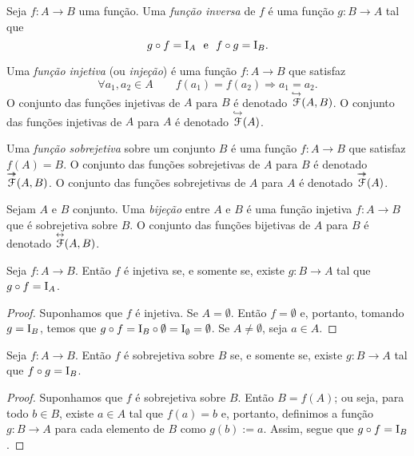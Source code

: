\begin{definition}
Seja $f\colon A \to B$ uma função. Uma \emph{função inversa} de $f$ é uma função $g\colon B \to A$ tal que
	\begin{equation*}
	g \circ f = \mathrm{I}_A \text{\ \ e\ \ } f \circ g = \mathrm{I}_B.
	\end{equation*}
\end{definition}

\begin{definition}
Uma \emph{função injetiva} (ou \emph{injeção}) é uma função $f\colon A \to B$ que satisfaz
	\begin{equation*}
	\forall a_1,a_2 \in A \qquad f(a_1)=f(a_2) \Rightarrow a_1=a_2.
	\end{equation*}
O conjunto das funções injetivas de $A$ para $B$ é denotado $\overset{\hookrightarrow}{\mathcal{F}}(A,B)$. O conjunto das funções injetivas de $A$ para $A$ é denotado $\overset{\hookrightarrow}{\mathcal{F}}(A)$.
\end{definition}

\begin{definition}
Uma \emph{função sobrejetiva} sobre um conjunto $B$ é uma função $f\colon A \to B$ que satisfaz $f(A)=B$. O conjunto das funções sobrejetivas de $A$ para $B$ é denotado $\Epi{\Func}(A,B)$. O conjunto das funções sobrejetivas de $A$ para $A$ é denotado $\Epi{\Func}(A)$.
\end{definition}

\begin{definition}
Sejam $A$ e $B$ conjunto. Uma \emph{bijeção} entre $A$ e $B$ é uma função injetiva $f\colon A \to B$ que é sobrejetiva sobre $B$. O conjunto das funções bijetivas de $A$ para $B$ é denotado $\overset{\leftrightarrow}{\mathcal{F}}(A,B)$.
\end{definition}

\begin{proposition}
\label{prop:func.inv.esq}
Seja $f\colon A \to B$. Então $f$ é injetiva se, e somente se, existe $g\colon B \to A$ tal que $g \circ f = \mathrm{I}_A$.
\end{proposition}
\begin{proof}
Suponhamos que $f$ é injetiva. Se $A = \emptyset$. Então $f=\emptyset$ e, portanto, tomando $g=\mathrm{I}_B$, temos que $g \circ f = \mathrm{I}_B \circ \emptyset = \mathrm{I}_\emptyset = \emptyset$.
	Se $A \neq \emptyset$, seja $a \in A$.
	
	
\end{proof}

\begin{proposition}
\label{prop:func.inv.dir}
Seja $f\colon A \to B$. Então $f$ é sobrejetiva sobre $B$ se, e somente se, existe $g\colon B \to A$ tal que $f \circ g = \mathrm{I}_B$.
\end{proposition}
\begin{proof}
Suponhamos que $f$ é sobrejetiva sobre $B$. Então $B=f(A)$; ou seja, para todo $b \in B$, existe $a \in A$ tal que $f(a)=b$ e, portanto, definimos a função $g\colon B \to A$ para cada elemento de $B$ como $g(b) := a$. Assim, segue que $g \circ f = \mathrm{I}_B$.
\end{proof}

